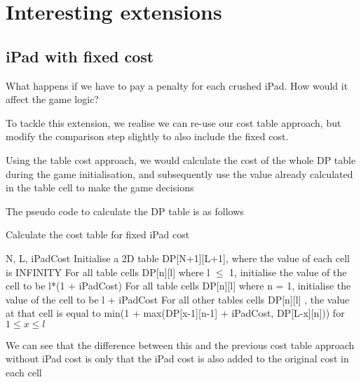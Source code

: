 \documentclass[12pt,a4paper,oneside]{report}
\begin{document}

\chapter{Interesting extensions}
\section{iPad with fixed cost}

What happens if we have to pay a penalty for each crushed iPad. How would it affect the game logic?



To tackle this extension, we realise we can re-use our cost table approach, but modify the comparison step slightly to also include the fixed cost. 

Using the table cost approach, we would calculate the cost of the whole DP table during the game initialisation, and subsequently use the value already calculated in the table cell to make the game decisions

The pseudo code to calculate the DP table is as follows
\begin{algorithm}
        \caption{Calculate the cost table for fixed iPad cost}
        \begin{algorithmic}[1]
            \REQUIRE N, L, iPadCost
            \STATE Initialise a 2D table DP[N+1][L+1], where the value of each cell is INFINITY
            \STATE For all table cells DP[n][l] where l $\leq$ 1, initialise the value of the cell to be l*(1 + iPadCost)
            \STATE For all table cells DP[n][l] where n = 1, initialise the value of the cell to be l + iPadCost
            \STATE For all other tables cells DP[n][l] , the value at that cell is equal to min(1 + max(DP[x-1][n-1] + iPadCost, DP[L-x][n])) for $1 \leq x \leq l$
        \end{algorithmic}
\end{algorithm}

We can see that the difference between this and the previous cost table approach without iPad cost is only that the iPad cost is also added to the original cost in each cell
\end{document}
